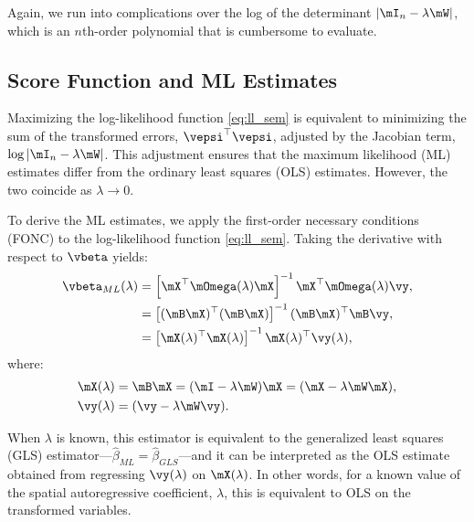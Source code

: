 \documentclass[english,12pt]{book}\usepackage[]{graphicx}\usepackage[]{xcolor}
\begin{document}
Again, we run into complications over the log of the determinant $\left|\mI_n - \lambda \mW\right|$, which is an $n$th-order polynomial that is cumbersome to evaluate. 

\subsection{Score Function and ML Estimates}\label{sec:sem_ml_estimates}

Maximizing the log-likelihood function \eqref{eq:ll_sem} is equivalent to minimizing the sum of the transformed errors, $\vepsi^\top\vepsi$, adjusted by the Jacobian term, $\log\left|\mI_n - \lambda \mW\right|$. This adjustment ensures that the maximum likelihood (ML) estimates differ from the ordinary least squares (OLS) estimates. However, the two coincide as $\lambda \to 0$. 

To derive the ML estimates, we apply the first-order necessary conditions (FONC) to the log-likelihood function  \eqref{eq:ll_sem}. Taking the derivative with respect to $\vbeta$ yields:
\begin{equation}\label{eq:beta_gls_ml}
  \begin{aligned}
\vbeta_{ML}(\lambda) & =\left[\mX^\top\mOmega(\lambda)\mX\right]^{-1}\mX^\top\mOmega(\lambda)\vy,\\
                     & = \left[(\mB\mX)^\top (\mB \mX)\right]^{-1} (\mB\mX)^\top \mB \vy, \\
                     & = \left[\mX(\lambda)^\top  \mX(\lambda)\right]^{-1} \mX(\lambda)^\top \vy(\lambda),
  \end{aligned}
\end{equation}
%
where:
\begin{equation*}
  \begin{aligned}
\mX(\lambda) & = \mB\mX = (\mI - \lambda\mW)\mX = (\mX - \lambda\mW\mX), \\
\vy(\lambda) & = (\vy - \lambda \mW \vy).
  \end{aligned}
\end{equation*}

When $\lambda$ is known, this estimator is equivalent to the generalized least squares (GLS) estimator---$\widehat{\beta}_{ML} = \widehat{\beta}_{GLS}$---and it can be interpreted as the OLS estimate obtained from regressing $\vy(\lambda)$ on $\mX(\lambda)$. In other words, for a known value of the spatial autoregressive coefficient, $\lambda$, this is equivalent to OLS on the transformed variables.
\end{document}
